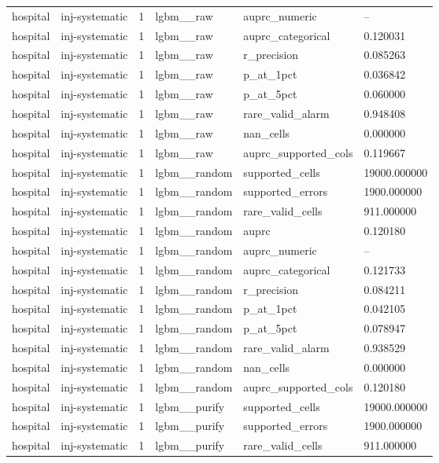 \begin{tabular}{llllll}
hospital & inj-systematic & 1 & lgbm\_\_raw & auprc\_numeric & -- \\
hospital & inj-systematic & 1 & lgbm\_\_raw & auprc\_categorical & 0.120031 \\
hospital & inj-systematic & 1 & lgbm\_\_raw & r\_precision & 0.085263 \\
hospital & inj-systematic & 1 & lgbm\_\_raw & p\_at\_1pct & 0.036842 \\
hospital & inj-systematic & 1 & lgbm\_\_raw & p\_at\_5pct & 0.060000 \\
hospital & inj-systematic & 1 & lgbm\_\_raw & rare\_valid\_alarm & 0.948408 \\
hospital & inj-systematic & 1 & lgbm\_\_raw & nan\_cells & 0.000000 \\
hospital & inj-systematic & 1 & lgbm\_\_raw & auprc\_supported\_cols & 0.119667 \\
hospital & inj-systematic & 1 & lgbm\_\_random & supported\_cells & 19000.000000 \\
hospital & inj-systematic & 1 & lgbm\_\_random & supported\_errors & 1900.000000 \\
hospital & inj-systematic & 1 & lgbm\_\_random & rare\_valid\_cells & 911.000000 \\
hospital & inj-systematic & 1 & lgbm\_\_random & auprc & 0.120180 \\
hospital & inj-systematic & 1 & lgbm\_\_random & auprc\_numeric & -- \\
hospital & inj-systematic & 1 & lgbm\_\_random & auprc\_categorical & 0.121733 \\
hospital & inj-systematic & 1 & lgbm\_\_random & r\_precision & 0.084211 \\
hospital & inj-systematic & 1 & lgbm\_\_random & p\_at\_1pct & 0.042105 \\
hospital & inj-systematic & 1 & lgbm\_\_random & p\_at\_5pct & 0.078947 \\
hospital & inj-systematic & 1 & lgbm\_\_random & rare\_valid\_alarm & 0.938529 \\
hospital & inj-systematic & 1 & lgbm\_\_random & nan\_cells & 0.000000 \\
hospital & inj-systematic & 1 & lgbm\_\_random & auprc\_supported\_cols & 0.120180 \\
hospital & inj-systematic & 1 & lgbm\_\_purify & supported\_cells & 19000.000000 \\
hospital & inj-systematic & 1 & lgbm\_\_purify & supported\_errors & 1900.000000 \\
hospital & inj-systematic & 1 & lgbm\_\_purify & rare\_valid\_cells & 911.000000 \\

\end{tabular}
